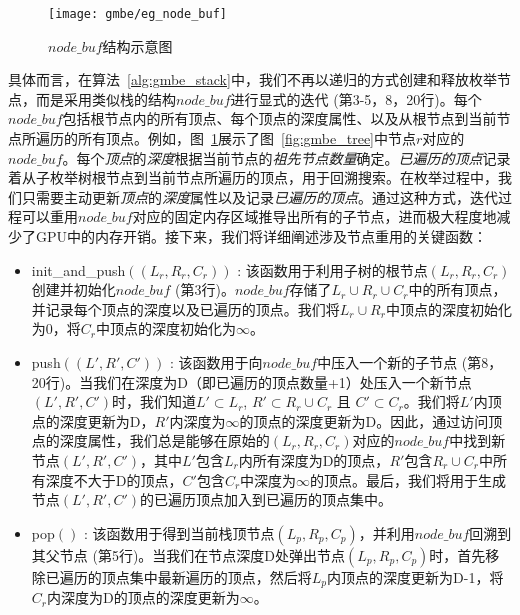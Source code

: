 \begin{figure} [t]
  \center
    \texttt{[image: gmbe/eg\_node\_buf]}
  \caption{$node\_buf$结构示意图}
  \label{fig:gmbe_node_buf}
\end{figure}


具体而言，在算法~\ref{alg:gmbe_stack}中，我们不再以递归的方式创建和释放枚举节点，而是采用类似栈的结构$node\_buf$进行显式的迭代 (第3-5，8，20行)。每个$node\_buf$包括根节点内的所有顶点、每个顶点的深度属性、以及从根节点到当前节点所遍历的所有顶点。例如，图~\ref{fig:gmbe_node_buf}展示了图~\ref{fig:gmbe_tree}中节点$r$对应的$node\_buf$。每个\textit{顶点}的\emph{\textit{深度}}根据当前节点的\emph{祖先节点数量}确定。\textit{已遍历的顶点}记录着从子枚举树根节点到当前节点所遍历的顶点，用于回溯搜索。在枚举过程中，我们只需要主动更新\textit{顶点}的\textit{深度}属性以及记录\textit{已遍历的顶点}。通过这种方式，迭代过程可以重用$node\_buf$对应的固定内存区域推导出所有的子节点，进而极大程度地减少了GPU中的内存开销。接下来，我们将详细阐述涉及节点重用的关键函数：



\begin{itemize}
  \item  \textsf{init\_and\_push}$((L_r,R_r,C_r))$ : 该函数用于利用子树的根节点$(L_r,R_r,C_r)$创建并初始化$node\_buf$ (第3行)。$node\_buf$存储了$L_r \cup R_r \cup C_r$中的所有顶点，并记录每个顶点的深度以及已遍历的顶点。我们将$L_r \cup R_r$中顶点的深度初始化为0，将$C_r$中顶点的深度初始化为$\infty$。
  
  \item  \textsf{push}$((L',R',C'))$ : 该函数用于向$node\_buf$中压入一个新的子节点 (第8，20行)。当我们在深度为D（即已遍历的顶点数量+1）处压入一个新节点$(L',R',C')$时，我们知道$L' \subset L_r$, $R' \subset R_r \cup C_r$ 且 $C' \subset C_r$。我们将$L'$内顶点的深度更新为D，$R'$内深度为$\infty$的顶点的深度更新为D。因此，通过访问顶点的深度属性，我们总是能够在原始的$(L_r,R_r,C_r)$对应的$node\_buf$中找到新节点$(L',R',C')$，其中$L'$包含$L_r$内所有深度为D的顶点，$R'$包含$R_r\cup C_r$中所有深度不大于D的顶点，$C'$包含$C_r$中深度为$\infty$的顶点。最后，我们将用于生成节点$(L',R',C')$的已遍历顶点加入到已遍历的顶点集中。

  \item  \textsf{pop}$()$ : 该函数用于得到当前栈顶节点$(L_p,R_p,C_p)$，并利用$node\_buf$回溯到其父节点 (第5行)。当我们在节点深度D处弹出节点$(L_p,R_p,C_p)$时，首先移除已遍历的顶点集中最新遍历的顶点，然后将$L_p$内顶点的深度更新为D-1，将$C_r$内深度为D的顶点的深度更新为$\infty$。
  
\end{itemize}





